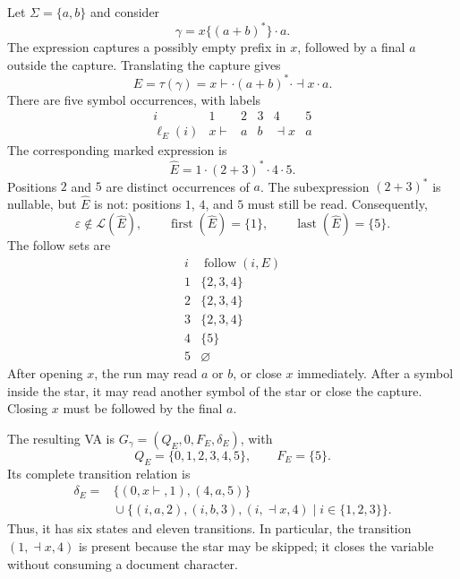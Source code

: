 \begin{example}
\label{ex:glushkov-capture}
Let $\Sigma=\{a,b\}$ and consider
\[
 \gamma=x\{(a+b)^*\}\cdot a.
\]
The expression captures a possibly empty prefix in $x$, followed by a final
$a$ outside the capture. Translating the capture gives
\[
 E=\tau(\gamma)=x\vdash\cdot(a+b)^*\cdot\dashv x\cdot a.
\]
There are five symbol occurrences, with labels
\[
\begin{array}{c|ccccc}
 i & 1 & 2 & 3 & 4 & 5\\ \hline
 \ell_E(i) & x\vdash & a & b & \dashv x & a
\end{array}
\]
The corresponding marked expression is
\[
 \widehat{E}=1\cdot(2+3)^*\cdot4\cdot5.
\]
Positions $2$ and $5$ are distinct occurrences of $a$. The subexpression
$(2+3)^*$ is nullable, but $\widehat{E}$ is not: positions $1$, $4$, and $5$ must
still be read. Consequently,
\[
 \varepsilon \notin \mathcal L(\widehat{E}),\qquad
 \operatorname{first}(\widehat{E})=\{1\},\qquad
 \operatorname{last}(\widehat{E})=\{5\}.
\]
The follow sets are
\[
\begin{array}{c|c}
 i & \operatorname{follow}(i,E)\\ \hline
 1 & \{2,3,4\}\\
 2 & \{2,3,4\}\\
 3 & \{2,3,4\}\\
 4 & \{5\}\\
 5 & \varnothing
\end{array}
\]
After opening $x$, the run may read $a$ or $b$, or close $x$ immediately.
After a symbol inside the star, it may read another symbol of the star or
close the capture. Closing $x$ must be followed by the final $a$.

The resulting VA is $G_\gamma=(Q_E,0,F_E,\delta_E)$, with
\[
 Q_E=\{0,1,2,3,4,5\},\qquad F_E=\{5\}.
\]
Its complete transition relation is
\[
\begin{aligned}
 \delta_E={}&\{(0,x\vdash,1),(4,a,5)\}\\
 &{}\cup\{(i,a,2),(i,b,3),(i,\dashv x,4)\mid i\in\{1,2,3\}\}.
\end{aligned}
\]
Thus, it has six states and eleven transitions. In particular, the
transition $(1,\dashv x,4)$ is present because the star may be skipped;
it closes the variable without consuming a document character.


\end{example}
